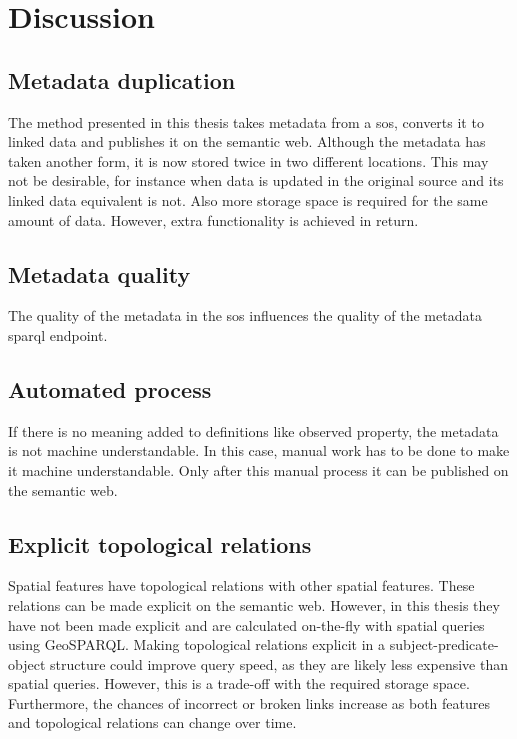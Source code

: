 
\chapter{Discussion}
\label{chap:disc}

\section{Metadata duplication}
The method presented in this thesis takes metadata from a \ac{sos}, converts it to linked data and publishes it on the semantic web. Although the metadata has taken another form, it is now stored twice in two different locations. This may not be desirable, for instance when data is updated in the original source and its linked data equivalent is not. Also more storage space is required for the same amount of data. However, extra functionality is achieved in return.  

\section{Metadata quality}
The quality of the metadata in the \ac{sos} influences the quality of the metadata \ac{sparql} endpoint. 

\section{Automated process}
If there is no meaning added to definitions like observed property, the metadata is not machine understandable. In this case, manual work has to be done to make it machine understandable. Only after this manual process it can be published on the semantic web.

\section{Explicit topological relations}
Spatial features have topological relations with other spatial features. These relations can be made explicit on the semantic web. However, in this thesis they have not been made explicit and are calculated on-the-fly with spatial queries using GeoSPARQL. Making topological relations explicit in a subject-predicate-object structure could improve query speed, as they are likely less expensive than spatial queries. However, this is a trade-off with the required storage space. Furthermore, the chances of incorrect or broken links increase as both features and topological relations can change over time.
